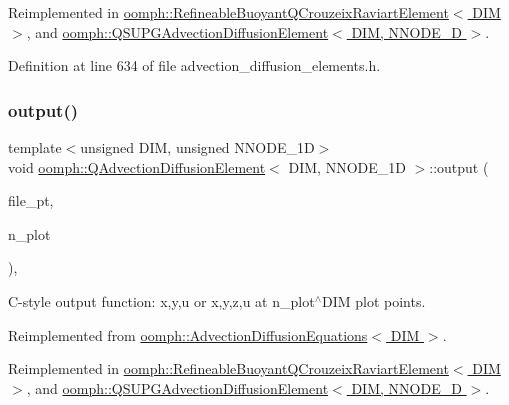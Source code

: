 Reimplemented in \hyperlink{classoomph_1_1RefineableBuoyantQCrouzeixRaviartElement_a90579086f991da7fbaf7d92b29abf994}{oomph\+::\+Refineable\+Buoyant\+Q\+Crouzeix\+Raviart\+Element$<$ D\+I\+M $>$}, and \hyperlink{classoomph_1_1QSUPGAdvectionDiffusionElement_a57517d0b9c06ffee384f70fe587076c2}{oomph\+::\+Q\+S\+U\+P\+G\+Advection\+Diffusion\+Element$<$ D\+I\+M, N\+N\+O\+D\+E\+\_\+D $>$}.



Definition at line 634 of file advection\+\_\+diffusion\+\_\+elements.\+h.

\mbox{\label{classoomph_1_1QAdvectionDiffusionElement_a891cdaba60a0cd6b3438f161fb537933}} 
\subsubsection{\texorpdfstring{output()}{output()}\hspace{0.1cm}{\footnotesize\ttfamily [4/4]}}
{\footnotesize\ttfamily template$<$unsigned D\+IM, unsigned N\+N\+O\+D\+E\+\_\+1D$>$ \\
void \hyperlink{classoomph_1_1QAdvectionDiffusionElement}{oomph\+::\+Q\+Advection\+Diffusion\+Element}$<$ D\+IM, N\+N\+O\+D\+E\+\_\+1D $>$\+::output (\begin{DoxyParamCaption}\item[{F\+I\+LE $\ast$}]{file\+\_\+pt,  }\item[{const unsigned \&}]{n\+\_\+plot }\end{DoxyParamCaption})\hspace{0.3cm}{\ttfamily [inline]}, {\ttfamily [virtual]}}



C-\/style output function\+: x,y,u or x,y,z,u at n\+\_\+plot$^\wedge$\+D\+IM plot points. 



Reimplemented from \hyperlink{classoomph_1_1AdvectionDiffusionEquations_a03a096ff864ee53c8823b08e0d2f6091}{oomph\+::\+Advection\+Diffusion\+Equations$<$ D\+I\+M $>$}.



Reimplemented in \hyperlink{classoomph_1_1RefineableBuoyantQCrouzeixRaviartElement_a650e1b0428cd160c72dbc3deda287b26}{oomph\+::\+Refineable\+Buoyant\+Q\+Crouzeix\+Raviart\+Element$<$ D\+I\+M $>$}, and \hyperlink{classoomph_1_1QSUPGAdvectionDiffusionElement_ac567806bf5318e95b1517cb80e8a3b78}{oomph\+::\+Q\+S\+U\+P\+G\+Advection\+Diffusion\+Element$<$ D\+I\+M, N\+N\+O\+D\+E\+\_\+D $>$}.



